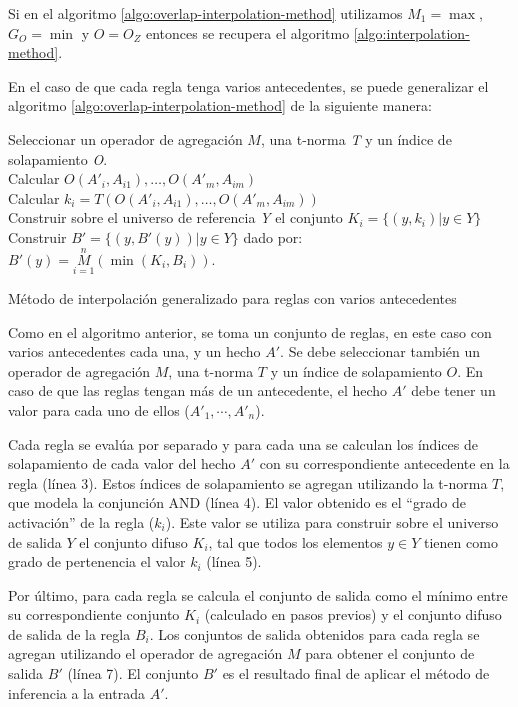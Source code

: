 Si en el algoritmo \ref{algo:overlap-interpolation-method} utilizamos $M_{1} = \max$, $G_{O} = \min$ y $O = O_{Z}$ entonces se recupera el algoritmo \ref{algo:interpolation-method}.

En el caso de que cada regla tenga varios antecedentes, se puede generalizar el algoritmo \ref{algo:overlap-interpolation-method} de la siguiente manera:

\begin{algorithm}
\DontPrintSemicolon
{}
\vspace{0.4 cm}
Seleccionar un operador de agregación $M$, una t-norma \emph{T} y un índice de solapamiento \emph{O}.\\
 {
Calcular $O(A'_{i}, A_{i1}),\ldots,O(A'_{m}, A_{im})$\\
Calcular $k_{i} = T(O(A'_{i}, A_{i1}),\ldots,O(A'_{m}, A_{im}))$\\
Construir sobre el universo de referencia \emph{Y} el conjunto $K_{i} = \{(y,k_{i})|y \in Y\}$
}
Construir $B' = \{(y, B'(y))|y \in Y\}$ dado por: \\
\centering
\nonl $B'(y) = \overset{n}{\underset{i=1}{M}}(\min(K_{i},B_{i}))$.\\
\;
\caption{Método de interpolación generalizado para reglas con varios antecedentes}
\label{algo:multi-overlap-interpolation-method}
\end{algorithm}

Como en el algoritmo anterior, se toma un conjunto de reglas, en este caso con varios antecedentes cada una, y un hecho $A'$. Se debe seleccionar también un operador de agregación $M$, una t-norma $T$ y un índice de solapamiento $O$. En caso de que las reglas tengan más de un antecedente, el hecho $A'$ debe tener un valor para cada uno de ellos ($A'_1,\cdots,A'_n$).

Cada regla se evalúa por separado y para cada una se calculan los índices de solapamiento de cada valor del hecho $A'$ con su correspondiente antecedente en la regla (línea 3). Estos índices de solapamiento se agregan utilizando la t-norma $T$, que modela la conjunción AND (línea 4). El valor obtenido es el ``grado de activación'' de la regla ($k_i$). Este valor se utiliza para construir sobre el universo de salida $Y$ el conjunto difuso $K_i$, tal que todos los elementos $y \in Y$ tienen como grado de pertenencia el valor $k_i$ (línea 5).

Por último, para cada regla se calcula el conjunto de salida como el mínimo entre su correspondiente conjunto $K_i$ (calculado en pasos previos) y el conjunto difuso de salida de la regla $B_i$. Los conjuntos de salida obtenidos para cada regla se agregan utilizando el operador de agregación $M$ para obtener el conjunto de salida $B'$ (línea 7). El conjunto $B'$ es el resultado final de aplicar el método de inferencia a la entrada $A'$.

